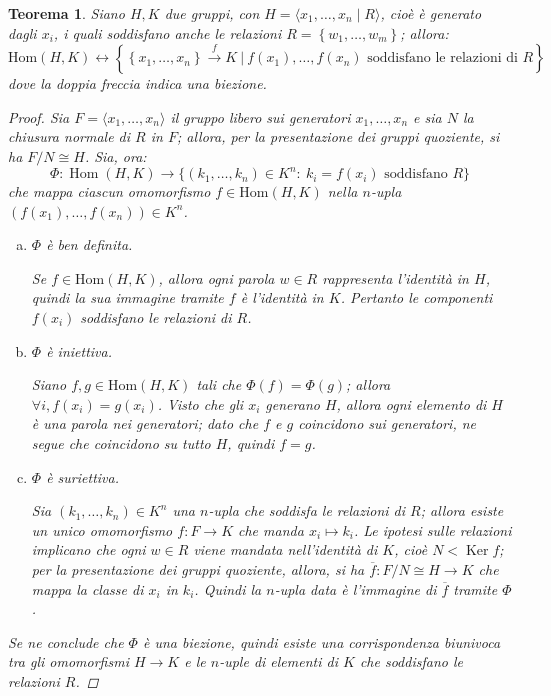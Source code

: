 \documentclass[11pt]{scrartcl}
\theoremstyle{style1}
\newtheorem{teorema}{Teorema}[section]
\numberwithin{equation}{subsection}
\begin{document}
\begin{teorema}\label{mitoat}
	Siano $H, K$ due gruppi, con $H = \langle x_1,\ldots,x_n  \mid R \rangle$, cio\`e \`e generato dagli $x_i$, i quali soddisfano anche le relazioni $R=\left\{ w_1,\ldots,w_m \right\} $; allora:
	\[
		\mathrm{Hom} (H,K) \longleftrightarrow
			\left\{ \left\{ x_1,\ldots,x_n \right\} \stackrel{f}{\longrightarrow} K \ \Big\lvert\ f(x_1),\ldots,f(x_n)\text{ soddisfano le relazioni di } R \right\} 
	\] 
	dove la doppia freccia indica una biezione.
	\begin{proof}
Sia \(F=\langle x_1,\dots,x_n\rangle\) il gruppo libero sui generatori \(x_1,\dots,x_n\) e sia \(N\) la chiusura normale di \(R\) in \(F\); allora, per la presentazione dei gruppi quoziente, si ha $F / N \cong H$. 
Sia, ora:
\[
\Phi:\operatorname{Hom}(H,K)\longrightarrow \{(k_1,\dots,k_n)\in K^n:\ k_i=f(x_i)\text{ soddisfano }R\}
\]
che mappa ciascun omomorfismo $f \in \mathrm{Hom} (H,K)$ nella $n$-upla \((f(x_1),\dots,f(x_n)) \in K^n\).

\begin{enumerate}[(a).]
	\item $\Phi$ \`e ben definita.

Se $f \in \mathrm{Hom} (H,K)$, allora ogni parola \(w\in R\) rappresenta l'identità in \(H\), quindi la sua immagine tramite \(f\) è l'identità in \(K\). 
Pertanto le componenti \(f(x_i)\) soddisfano le relazioni di \(R\).

\item $\Phi$ \`e iniettiva.

Siano \(f,g \in \mathrm{Hom} (H,K)\) tali che \(\Phi(f)=\Phi(g)\); allora \(\forall i, f(x_i)=g(x_i)\).
Visto che gli \(x_i\) generano \(H\), allora ogni elemento di \(H\) è una parola nei generatori; dato che \(f\) e \(g\) coincidono sui generatori, ne segue che coincidono su tutto \(H\), quindi \(f=g\).

\item $\Phi$ \`e suriettiva.

Sia \((k_1,\dots,k_n)\in K^n\) una \(n\)-upla che soddisfa le relazioni di \(R\); allora esiste un unico omomorfismo $f : F \to K$ che manda \(x_i\longmapsto k_i\).
Le ipotesi sulle relazioni implicano che ogni \(w\in R\) viene mandata nell'identità di \(K\), cioè $N < \operatorname{Ker} f$; per la presentazione dei gruppi quoziente, allora, si ha $\overline{f}:F / N \cong H \longrightarrow K$ che mappa la classe di $x_i$ in $k_i$.
Quindi la $n$-upla data è l'immagine di $\overline{f}$ tramite \(\Phi\).
\end{enumerate}
Se ne conclude che \(\Phi\) è una biezione, quindi esiste una corrispondenza biunivoca tra gli omomorfismi \(H\to K\) e le \(n\)-uple di elementi di \(K\) che soddisfano le relazioni \(R\). 
\end{proof}
\end{teorema}
\end{document}
